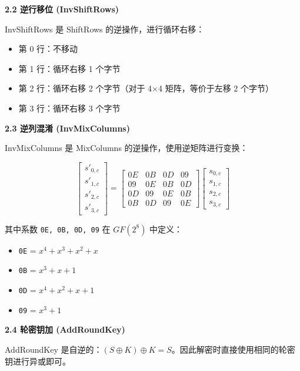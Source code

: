 \documentclass[12pt, a4paper]{article}
\begin{document}
\textbf{2.2 逆行移位 (InvShiftRows)}

InvShiftRows 是 ShiftRows 的逆操作，进行循环右移：

\begin{itemize}
    \item 第 0 行：不移动
    \item 第 1 行：循环右移 1 个字节
    \item 第 2 行：循环右移 2 个字节（对于 4×4 矩阵，等价于左移 2 个字节）
    \item 第 3 行：循环右移 3 个字节
\end{itemize}

\textbf{2.3 逆列混淆 (InvMixColumns)}

InvMixColumns 是 MixColumns 的逆操作，使用逆矩阵进行变换：

\begin{tcolorbox}[mathbox]
$$
\begin{bmatrix}
s'_{0,c} \\ s'_{1,c} \\ s'_{2,c} \\ s'_{3,c}
\end{bmatrix}
=
\begin{bmatrix}
0E & 0B & 0D & 09 \\
09 & 0E & 0B & 0D \\
0D & 09 & 0E & 0B \\
0B & 0D & 09 & 0E
\end{bmatrix}
\begin{bmatrix}
s_{0,c} \\ s_{1,c} \\ s_{2,c} \\ s_{3,c}
\end{bmatrix}
$$
\end{tcolorbox}

其中系数 \texttt{0E, 0B, 0D, 09} 在 $GF(2^8)$ 中定义：
\begin{itemize}
    \item \texttt{0E} = $x^4 + x^3 + x^2 + x$
    \item \texttt{0B} = $x^3 + x + 1$
    \item \texttt{0D} = $x^4 + x^2 + x + 1$
    \item \texttt{09} = $x^3 + 1$
\end{itemize}

\textbf{2.4 轮密钥加 (AddRoundKey)}

AddRoundKey 是自逆的：$(S \oplus K) \oplus K = S$。因此解密时直接使用相同的轮密钥进行异或即可。
\end{document}
